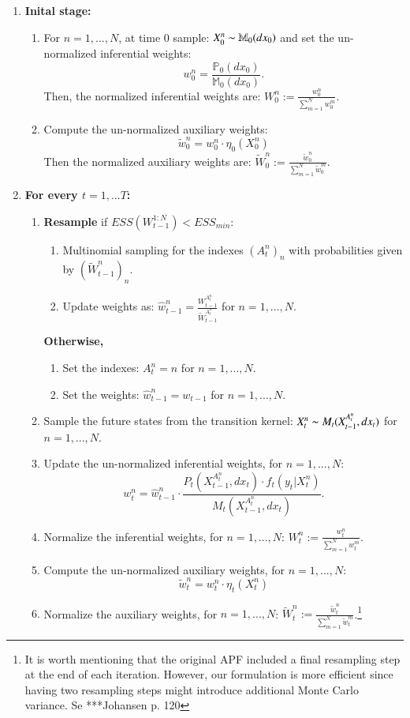 \documentclass[
]{book}
\theoremstyle{break}
\theoremstyle{nonumberplain}
\begin{document}
\begin{enumerate}
    \item \textbf{Inital stage: }
    \begin{enumerate}
        \item For $n=1,...,N$, at time 0 sample: $X_0^n\thicksim\mathbb M_0(dx_0)$ and set the un-normalized inferential weights: 
    $$w_0^n=\frac{\mathbb P_0(dx_0)}{\mathbb M_0(dx_0)}.$$
    Then, the normalized inferential weights are: $W_0^n:=\frac{w_0^n}{\sum_{m=1}^Nw_0^m}$.
    \item Compute the un-normalized auxiliary weights:
        $$\tilde w_0^n=w_0^n \cdot \eta_0(X_0^n)$$
        Then the normalized auxiliary weights are:
        $\tilde W_0^n:=\frac{\tilde w_0^n}{\sum_{m=1}^N\tilde w_0^m}$.
    \end{enumerate}
    \item \textbf{For every $t=1,...T$:}
    \begin{enumerate}
        \item \textbf{Resample} if $ESS( W_{t-1}^{1:N})<ESS_{min}$:
\begin{enumerate}
    \item Multinomial sampling for the indexes $(A_t^n)_n$ with probabilities given by $(\tilde W_{t-1}^n)_n$.
    \item Update weights as: $\hat w_{t-1}^n = \frac{W_{t-1}^{A_t^n}}{\tilde W_{t-1}^{A_t^n}} $ for $n=1,...,N$.
\end{enumerate}
\textbf{Otherwise, } 
\begin{enumerate}
    \item Set the indexes: $A_t^{n}=n$ for  $n=1,...,N$.
    \item Set the weights: $\hat w_{t-1}^n = w_{t-1}$ for $n=1,...,N$.
\end{enumerate}
\item Sample the future states from the transition kernel: $X_t^n\thicksim M_t(X_{t-1}^{A_t^n},dx_t)$ for $n=1,...,N$.
\item Update the un-normalized inferential weights, for $n=1,...,N$:
\begin{equation*}
    w_t^n=\hat w_{t-1}^n\cdot \frac{P_t(X_{t-1}^{A_t^n},dx_t)\cdot f_t(y_t|X_t^n)}{ M_t(X_{t-1}^{A_t^n},dx_t)}.
\end{equation*}
\item Normalize the inferential weights, for $n=1,...,N$:  $W_t^n:=\frac{w_t^n}{\sum_{m=1}^Nw_t^m}$.
\item Compute the un-normalized auxiliary weights, for $n=1,...,N$:
\begin{equation*}
 \tilde w_t^n=w_t^n \cdot \eta_t(X_t^n)
\end{equation*}
\item Normalize the auxiliary weights, for $n=1,...,N$:  $\tilde W_t^n:=\frac{\tilde w_t^n}{\sum_{m=1}^N\tilde w_t^m}$.\footnote{It is worth mentioning that the original APF included a final resampling step at the end of each iteration. However, our formulation is more efficient since having two resampling steps might introduce additional Monte Carlo variance. Se ***Johansen p. 120}
    \end{enumerate}
\end{enumerate}
\end{document}
